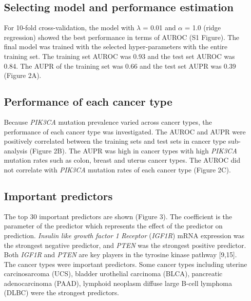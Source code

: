 \documentclass[10pt,letterpaper]{article}
\begin{document}
\hypertarget{selecting-model-and-performance-estimation}{%
\subsection{Selecting model and performance
estimation}\label{selecting-model-and-performance-estimation}}

For 10-fold cross-validation, the model with \(\lambda\) = 0.01 and
\(\alpha\) = 1.0 (ridge regression) showed the best performance in terms
of AUROC (S1 Figure). The final model was trained with the selected
hyper-parameters with the entire training set. The training set AUROC
was 0.93 and the test set AUROC was 0.84. The AUPR of the training set
was 0.66 and the test set AUPR was 0.39 (Figure 2A).

\hypertarget{performance-of-each-cancer-type}{%
\subsection{Performance of each cancer
type}\label{performance-of-each-cancer-type}}

Because \emph{PIK3CA} mutation prevalence varied across cancer types,
the performance of each cancer type was investigated. The AUROC and AUPR
were positively correlated between the training sets and test sets in
cancer type sub-analysis (Figure 2B). The AUPR was high in cancer types
with high \emph{PIK3CA} mutation rates such as colon, breast and uterus
cancer types. The AUROC did not correlate with \emph{PIK3CA} mutation
rates of each cancer type (Figure 2C).

\hypertarget{important-predictors}{%
\subsection{Important predictors}\label{important-predictors}}

The top 30 important predictors are shown (Figure 3). The coefficient is
the parameter of the predictor which represents the effect of the
predictor on prediction. \emph{Insulin like growth factor 1 Receptor}
(\emph{IGF1R}) mRNA expression was the strongest negative predictor, and
\emph{PTEN} was the strongest positive predictor. Both \emph{IGF1R} and
\emph{PTEN} are key players in the tyrosine kinase pathway {[}9,15{]}.
The cancer types were important predictors. Some cancer types including
uterine carcinosarcoma (UCS), bladder urothelial carcinoma (BLCA),
pancreatic adenocarcinoma (PAAD), lymphoid neoplasm diffuse large B-cell
lymphoma (DLBC) were the strongest predictors.
\end{document}
